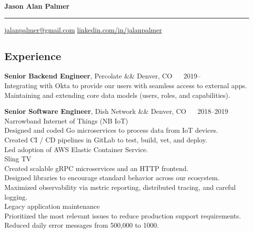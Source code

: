\documentclass[12pt]{report}
\makeatletter
\renewcommand{\bullet}{$\vcenter{\hbox{~\huge$\cdot$~}}$}
\newenvironment{jobhead}
{\tabularx{\textwidth}{ @{} l X r @{} }}
{\endtabularx}
\newenvironment{bullets}
{\tabularx{\textwidth}{ @{\bullet} X @{} }}
{\endtabularx}
\makeatother
\begin{document}
\centerline{\textbf{\large Jason Alan Palmer}}

\rule{\textwidth}{1pt}

\href{mailto:jalanpalmer@gmail.com}{jalanpalmer@gmail.com}
\hfill
\href{https://www.linkedin.com/in/jalanpalmer}{linkedin.com/in/jalanpalmer}


\subsection*{Experience}

\begin{jobhead}
\textbf{Senior Backend Engineer}, Percolate && Denver, CO ~~ 2019--~~~~~~ \\
\end{jobhead}
\begin{bullets}
Integrating with Okta to provide our users with seamless access to external apps. \\
Maintaining and extending core data models (users, roles, and capabilities). \\
\end{bullets}

\begin{jobhead}
\textbf{Senior Software Engineer}, Dish Network && Denver, CO ~~ 2018--2019 \\
\end{jobhead}
Narrowband Internet of Things (NB IoT) \\
\begin{bullets}
Designed and coded Go microservices to process data from IoT devices. \\
Created CI / CD pipelines in GitLab to test, build, vet, and deploy. \\
Led adoption of AWS Elastic Container Service. \\
\end{bullets}
Sling TV \\
\begin{bullets}
Created scalable gRPC microservices and an HTTP frontend. \\
Designed libraries to encourage standard behavior across our ecosystem. \\
Maximized observability via metric reporting, distributed tracing, and careful logging. \\
\end{bullets}
Legacy application maintenance \\
\begin{bullets}
Prioritized the most relevant issues to reduce production support requirements. \\
Reduced daily error messages from 500,000 to 1000. \\
\end{bullets}
\end{document}
